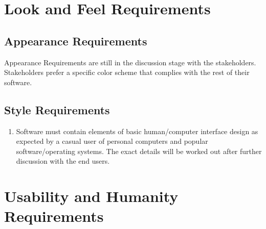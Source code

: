 \documentclass[paper=letter, fontsize=10pt]{scrartcl}
\numberwithin{equation}{section}		%
\numberwithin{figure}{section}			%
\numberwithin{table}{section}				%
\begin{document}
\section{Look and Feel Requirements}
\subsection{Appearance Requirements}
Appearance Requirements are still in the discussion stage with the stakeholders. Stakeholders prefer a specific color scheme that complies with the rest of their software.
\subsection{Style Requirements}
\begin{enumerate}
	\item Software must contain elements of basic human/computer interface design as expected by a casual user of personal computers and popular software/operating systems. The exact details will be worked out after further discussion with the end users.
\end{enumerate}

\section{Usability and Humanity Requirements}
\end{document}
